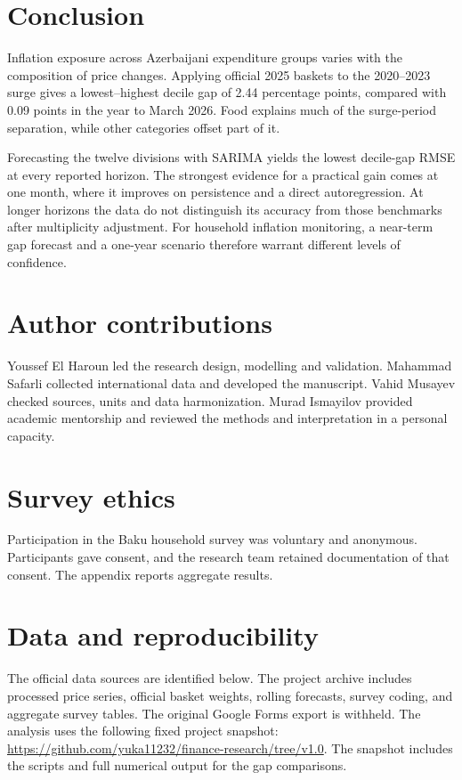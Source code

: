 \documentclass[11pt,a4paper]{article}
\begin{document}
\section{Conclusion}

Inflation exposure across Azerbaijani expenditure groups varies with the composition of price changes. Applying official 2025 baskets to the 2020--2023 surge gives a lowest--highest decile gap of 2.44 percentage points, compared with 0.09 points in the year to March 2026. Food explains much of the surge-period separation, while other categories offset part of it.

Forecasting the twelve divisions with SARIMA yields the lowest decile-gap RMSE at every reported horizon. The strongest evidence for a practical gain comes at one month, where it improves on persistence and a direct autoregression. At longer horizons the data do not distinguish its accuracy from those benchmarks after multiplicity adjustment. For household inflation monitoring, a near-term gap forecast and a one-year scenario therefore warrant different levels of confidence.

\section*{Author contributions}

Youssef El Haroun led the research design, modelling and validation. Mahammad Safarli collected international data and developed the manuscript. Vahid Musayev checked sources, units and data harmonization. Murad Ismayilov provided academic mentorship and reviewed the methods and interpretation in a personal capacity.

\section*{Survey ethics}

Participation in the Baku household survey was voluntary and anonymous. Participants gave consent, and the research team retained documentation of that consent. The appendix reports aggregate results.

\section*{Data and reproducibility}

The official data sources are identified below. The project archive includes processed price series, official basket weights, rolling forecasts, survey coding, and aggregate survey tables. The original Google Forms export is withheld. The analysis uses the following fixed project snapshot: \url{https://github.com/yuka11232/finance-research/tree/v1.0}. The snapshot includes the scripts and full numerical output for the gap comparisons.
\end{document}
